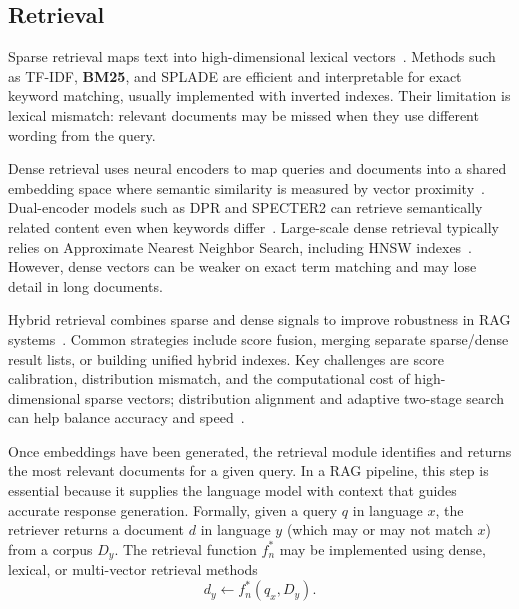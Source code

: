 \subsection{Retrieval}

Sparse retrieval maps text into high-dimensional lexical vectors~\cite{robertson2009probabilistic}. Methods such as TF-IDF, \textbf{BM25}, and SPLADE are efficient and interpretable for exact keyword matching, usually implemented with inverted indexes. Their limitation is lexical mismatch: relevant documents may be missed when they use different wording from the query.



Dense retrieval uses neural encoders to map queries and documents into a shared embedding space where semantic similarity is measured by vector proximity~\cite{karpukhin2020dense}. Dual-encoder models such as DPR and SPECTER2 can retrieve semantically related content even when keywords differ~\cite{singh2022scirepeval}. Large-scale dense retrieval typically relies on Approximate Nearest Neighbor Search, including HNSW indexes~\cite{malkov2016efficient}. However, dense vectors can be weaker on exact term matching and may lose detail in long documents.

Hybrid retrieval combines sparse and dense signals to improve robustness in RAG systems~\cite{lewis2020rag, karpukhin2020dense}. Common strategies include score fusion, merging separate sparse/dense result lists, or building unified hybrid indexes. Key challenges are score calibration, distribution mismatch, and the computational cost of high-dimensional sparse vectors; distribution alignment and adaptive two-stage search can help balance accuracy and speed~\cite{iida2022unsupervised}.

Once embeddings have been generated, the retrieval module identifies and returns the most relevant
documents for a given query. In a RAG pipeline, this step is essential because it supplies the language
model with context that guides accurate response generation. Formally, given a query $q$ in language $x$,
the retriever returns a document $d$ in language $y$ (which may or may not match $x$) from a corpus
$D_y$. The retrieval function $f_n^\ast$ may be implemented using dense, lexical, or multi-vector retrieval
methods~\cite{chen2024bge}
\[
    d_y \leftarrow f_n^\ast(q_x, D_y).
\]

